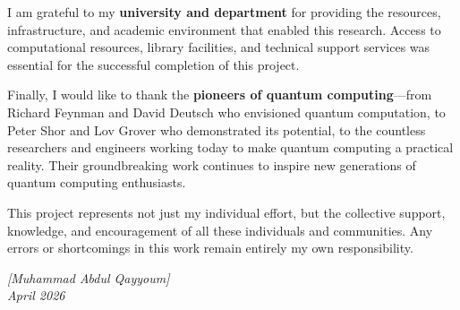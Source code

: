 I am grateful to my \textbf{university and department} for providing the resources, infrastructure, and academic environment that enabled this research. Access to computational resources, library facilities, and technical support services was essential for the successful completion of this project.

Finally, I would like to thank the \textbf{pioneers of quantum computing}—from Richard Feynman and David Deutsch who envisioned quantum computation, to Peter Shor and Lov Grover who demonstrated its potential, to the countless researchers and engineers working today to make quantum computing a practical reality. Their groundbreaking work continues to inspire new generations of quantum computing enthusiasts.

This project represents not just my individual effort, but the collective support, knowledge, and encouragement of all these individuals and communities. Any errors or shortcomings in this work remain entirely my own responsibility.

\vspace{1cm}

\begin{flushright}
\textit{[Muhammad Abdul Qayyoum]}\\
\textit{April 2026}
\end{flushright}
